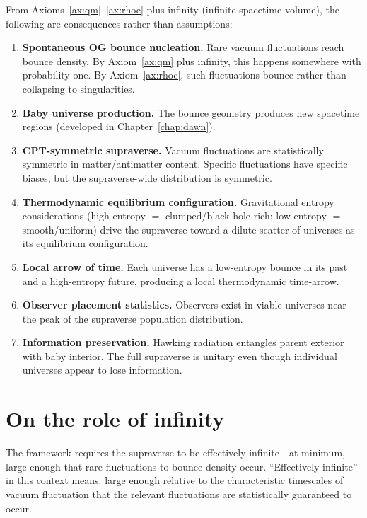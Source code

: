 From Axioms~\ref{ax:qm}--\ref{ax:rhoc} plus infinity (infinite spacetime
volume), the following are consequences rather than assumptions:

\begin{enumerate}
  \item \textbf{Spontaneous OG bounce nucleation.} Rare vacuum fluctuations reach
    bounce density. By Axiom~\ref{ax:qm} plus infinity, this happens somewhere
    with probability one. By Axiom~\ref{ax:rhoc}, such fluctuations bounce rather
    than collapsing to singularities.
  \item \textbf{Baby universe production.} The bounce geometry produces new
    spacetime regions (developed in Chapter~\ref{chap:dawn}).
  \item \textbf{CPT-symmetric supraverse.} Vacuum fluctuations are statistically
    symmetric in matter/antimatter content. Specific fluctuations have specific
    biases, but the supraverse-wide distribution is symmetric.
  \item \textbf{Thermodynamic equilibrium configuration.} Gravitational entropy
    considerations (high entropy $=$ clumped/black-hole-rich; low entropy $=$
    smooth/uniform) drive the supraverse toward a dilute scatter of universes as its
    equilibrium configuration.
  \item \textbf{Local arrow of time.} Each universe has a low-entropy bounce in
    its past and a high-entropy future, producing a local thermodynamic
    time-arrow.
  \item \textbf{Observer placement statistics.} Observers exist in viable
    universes near the peak of the supraverse population distribution.
  \item \textbf{Information preservation.} Hawking radiation entangles parent
    exterior with baby interior. The full supraverse is unitary even though
    individual universes appear to lose information.
\end{enumerate}

\section{On the role of infinity}

The framework requires the supraverse to be effectively infinite---at minimum,
large enough that rare fluctuations to bounce density occur. ``Effectively
infinite'' in this context means: large enough relative to the characteristic
timescales of vacuum fluctuation that the relevant fluctuations are
statistically guaranteed to occur.

